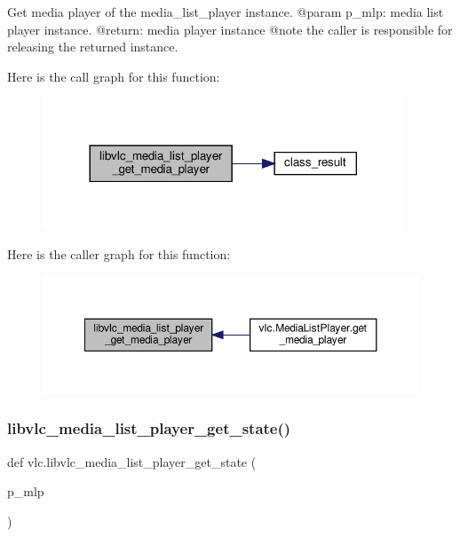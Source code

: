 \begin{DoxyVerb}Get media player of the media_list_player instance.
@param p_mlp: media list player instance.
@return: media player instance @note the caller is responsible for releasing the returned instance.
\end{DoxyVerb}
 Here is the call graph for this function\+:
\nopagebreak
\begin{figure}[H]
\begin{center}
\leavevmode
\includegraphics[width=305pt]{namespacevlc_a2da962bb3cca726aa13428060f11e7e8_cgraph}
\end{center}
\end{figure}
Here is the caller graph for this function\+:
\nopagebreak
\begin{figure}[H]
\begin{center}
\leavevmode
\includegraphics[width=350pt]{namespacevlc_a2da962bb3cca726aa13428060f11e7e8_icgraph}
\end{center}
\end{figure}
\mbox{\label{namespacevlc_a763990d86ad08b9968f1f4263d634f26}} 
\subsubsection{\texorpdfstring{libvlc\+\_\+media\+\_\+list\+\_\+player\+\_\+get\+\_\+state()}{libvlc\_media\_list\_player\_get\_state()}}
{\footnotesize\ttfamily def vlc.\+libvlc\+\_\+media\+\_\+list\+\_\+player\+\_\+get\+\_\+state (\begin{DoxyParamCaption}\item[{}]{p\+\_\+mlp }\end{DoxyParamCaption})}

